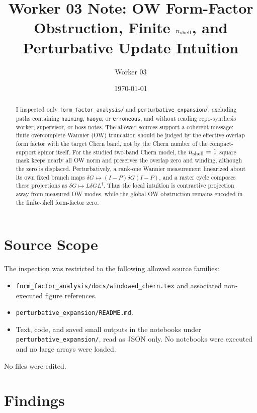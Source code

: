 \documentclass[aps,prb,onecolumn,nofootinbib,superscriptaddress]{revtex4-2}
\begin{document}
\title{Worker 03 Note: OW Form-Factor Obstruction, Finite \texorpdfstring{$n_{\rm shell}$}{nshell}, and Perturbative Update Intuition}
\author{Worker 03}
\date{\today}

\begin{abstract}
I inspected only \texttt{form\_factor\_analysis/} and \texttt{perturbative\_expansion/}, excluding paths containing \texttt{haining}, \texttt{haoyu}, or \texttt{erroneous}, and without reading repo-synthesis worker, supervisor, or boss notes.  The allowed sources support a coherent message: finite overcomplete Wannier (OW) truncation should be judged by the effective overlap form factor with the target Chern band, not by the Chern number of the compact-support spinor itself.  For the studied two-band Chern model, the $n_{\rm shell}=1$ square mask keeps nearly all OW norm and preserves the overlap zero and winding, although the zero is displaced.  Perturbatively, a rank-one Wannier measurement linearized about its own fixed branch maps $\delta G\mapsto (I-P)\delta G(I-P)$, and a raster cycle composes these projections as $\delta G\mapsto L\delta G L^\dagger$.  Thus the local intuition is contractive projection away from measured OW modes, while the global OW obstruction remains encoded in the finite-shell form-factor zero.
\end{abstract}

\maketitle
\setcounter{tocdepth}{2}
\tableofcontents

\section{Source Scope}

The inspection was restricted to the following allowed source families:
\begin{itemize}
\item \texttt{form\_factor\_analysis/docs/windowed\_chern.tex} and associated non-executed figure references.
\item \texttt{perturbative\_expansion/README.md}.
\item Text, code, and saved small outputs in the notebooks under \texttt{perturbative\_expansion/}, read as JSON only.  No notebooks were executed and no large arrays were loaded.
\end{itemize}
No files were edited.

\section{Findings}
\end{document}
